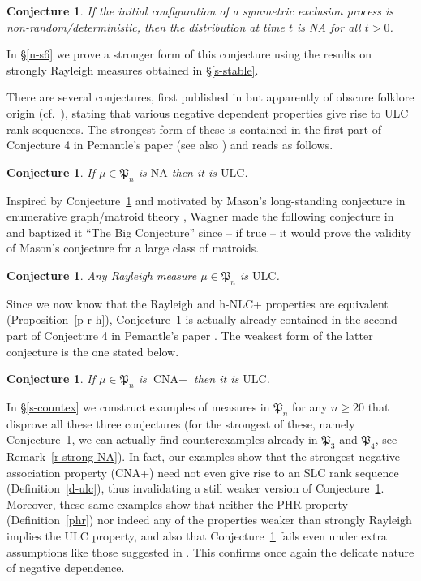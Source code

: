 \documentclass[10pt,reqno]{amsart}
\theoremstyle{plain}
\newtheorem{conjecture}[problem]{Conjecture}
\theoremstyle{definition}
\theoremstyle{remark}
\newcommand{\CNA}{\text{CNA}}
\newcommand{\NA}{\text{NA}}
\newcommand{\ULC}{\text{ULC}}
\newcommand{\fP}{\mathfrak{P}}
\begin{document}
\begin{conjecture}\label{con-lig}
If the initial configuration of a symmetric exclusion process
is non-random/deterministic, then the distribution at time $t$ is NA for 
all $t>0$.
\end{conjecture}

In \S \ref{n-s6} we prove a stronger form of this conjecture using the 
results on strongly Rayleigh measures obtained in \S \ref{s-stable}.

There are several conjectures, first published in \cite{P} 
but apparently 
of obscure folklore origin (cf.~\cite{W}), stating that various negative
dependent properties give rise to ULC rank sequences. The strongest form
of these is contained in the first part of Conjecture 4 in Pemantle's paper 
\cite{P} (see also \cite[Conjecture 3.9]{W}) and reads as follows.

\begin{conjecture}\label{c-p}
If $\mu\in\fP_n$ is $\NA$ then it is $\ULC$.
\end{conjecture}

Inspired by Conjecture~\ref{c-p} 
and motivated by Mason's long-standing
conjecture in enumerative graph/matroid theory \cite{Mason}, Wagner made the 
following conjecture in \cite[Conjecture 3.4]{W} and baptized it 
``The Big Conjecture'' since -- if true -- it would prove the validity of 
Mason's conjecture for a large class of matroids.  

\begin{conjecture}\label{big}
Any Rayleigh measure $\mu\in\fP_n$ is $\ULC$.
\end{conjecture}

Since we now know that the Rayleigh and h-NLC+ properties are equivalent 
(Proposition~\ref{p-r-h}), 
Conjecture~\ref{big} is actually already contained in the second part
of Conjecture 4 in Pemantle's paper \cite{P}. The weakest form of the latter 
conjecture is the one stated below.

\begin{conjecture}\label{cna-ulc}
If $\mu\in\fP_n$ is $\CNA+$ then it is $\ULC$.
\end{conjecture}

In \S \ref{s-countex} we construct examples of measures in $\fP_n$ for any
$n\ge 20$ that disprove all these three conjectures (for the strongest
of these, namely Conjecture~\ref{c-p}, we can actually find
counterexamples already in $\fP_3$ and $\fP_4$, see Remark~\ref{r-strong-NA}).
In fact, our examples 
show that the strongest negative association property (CNA+) 
need not even give rise to an SLC rank sequence 
(Definition~\ref{d-ulc}), thus invalidating a still weaker version of 
Conjecture~\ref{cna-ulc}. Moreover, these same examples show that
neither the PHR property (Definition~\ref{phr}) nor
indeed any of the properties weaker than strongly Rayleigh implies the 
ULC property, and also that Conjecture~\ref{cna-ulc} fails even under extra 
assumptions like those suggested in \cite[Problem 6]{BBCV}. This confirms 
once again the delicate nature of negative dependence.
\end{document}
